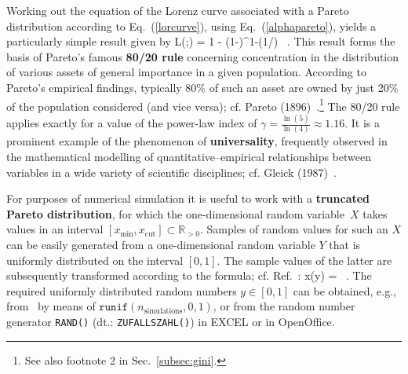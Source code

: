 \medskip
\noindent
Working out the equation of the Lorenz curve associated with a 
Pareto distribution according to Eq.~(\ref{lorcurve}), using
Eq.~(\ref{alphapareto}), yields a particularly simple result
given by
%
\be
L(\alpha;\gamma) = 1 - (1-\alpha)^{1-(1/\gamma)} \ .
\ee
%
This result forms the basis of Pareto's famous \textbf{80/20 rule} 
concerning concentration in the distribution of various assets of 
general importance in a given population. According to Pareto's 
empirical findings, typically 80\% of such an asset are owned by 
just 20\% of the population considered (and vice versa); cf. 
Pareto (1896)~.\footnote{See also footnote 2 in 
Sec.~\ref{subsec:gini}.} The 80/20 rule applies exactly for a 
value of the power-law index of ${\displaystyle\gamma = 
\frac{\ln(5)}{\ln(4)}} \approx 1.16$. It is a prominent example of 
the phenomenon of \textbf{universality}, frequently observed in the 
mathematical modelling of quantitative--empirical relationships 
between variables in a wide variety of scientific disciplines; cf. 
Gleick (1987)~.

\medskip
\noindent
For purposes of numerical simulation it is useful to work with a 
\textbf{truncated Pareto distribution}, for which the
one-dimensional random variable~$X$ takes values in an interval
$\left[x_\mathrm{min},x_\mathrm{cut}\right] \subset
\mathbb{R}_{>0}$. Samples of 
random values for such an $X$ can be easily generated from a 
one-dimensional random variable $Y$ that is uniformly distributed 
on the interval $\left[0,1\right]$. The sample values of the latter
are subsequently transformed according to the formula; cf. 
Ref.~:
%
\be
x(y) =  \ .
\ee
%
The required uniformly distributed random numbers $y \in 
\left[0,1\right]$ can be obtained, e.g., from \R\ by means of
$\texttt{runif}(n_{\mathrm{simulations}},0,1)$, or from the random
number generator \texttt{RAND()} (dt.: \texttt{ZUFALLSZAHL()})
in EXCEL or in OpenOffice.

